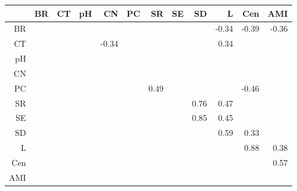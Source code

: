 \begin{table}[ht]
\centering
\begin{tabular}{rrrrrrrrrrrr}
  \hline
 & BR & CT & pH & CN & PC & SR & SE & SD & L & Cen & AMI \\ 
  \hline
BR &  &  &  &  &  &  &  &  & -0.34 & -0.39 & -0.36 \\ 
  CT &  &  &  & -0.34 &  &  &  &  & 0.34 &  &  \\ 
  pH &  &  &  &  &  &  &  &  &  &  &  \\ 
  CN &  &  &  &  &  &  &  &  &  &  &  \\ 
  PC &  &  &  &  &  & 0.49 &  &  &  & -0.46 &  \\ 
  SR &  &  &  &  &  &  &  & 0.76 & 0.47 &  &  \\ 
  SE &  &  &  &  &  &  &  & 0.85 & 0.45 &  &  \\ 
  SD &  &  &  &  &  &  &  &  & 0.59 & 0.33 &  \\ 
  L &  &  &  &  &  &  &  &  &  & 0.88 & 0.38 \\ 
  Cen &  &  &  &  &  &  &  &  &  &  & 0.57 \\ 
  AMI &  &  &  &  &  &  &  &  &  &  &  \\ 
   \hline
\end{tabular}
\end{table}
